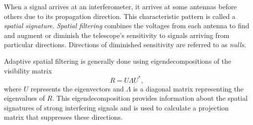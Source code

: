 \documentclass[11pt,twoside]{article}
\begin{document}
When a signal arrives at an interferometer, it arrives at some antennas before others due to its propagation direction.
This characteristic pattern is called a \textit{spatial signature}.
\textit{Spatial filtering} combines the voltages from each antenna to find and augment or diminish the telescope's sensitivity to signals arriving from particular directions.
Directions of diminished sensitivity are referred to as \textit{nulls}.


Adaptive spatial filtering is generally done using eigendecompositions of the visibility matrix
\begin{equation}
R = U \Lambda U^{*},
\end{equation} 
where $U$ represents the eigenvectors and $\Lambda$ is a diagonal matrix representing the eigenvalues of $R$.
This eigendecomposition provides information about the spatial signatures of strong interfering signals and is used to calculate a projection matrix that suppresses these directions.

\end{document}
